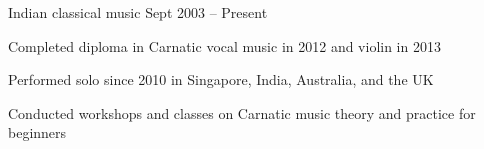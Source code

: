 \begin{cventries}
	{Indian classical music} %
	{} %
	{Sept 2003 -- Present} %
	{
		\begin{cvitems} %
			\item Completed diploma in Carnatic vocal music in 2012 and violin in 2013
			\item Performed solo since 2010 in Singapore, India, Australia, and the UK
			\item Conducted workshops and classes on Carnatic music theory and practice for beginners
		\end{cvitems}
	}


\end{cventries}
